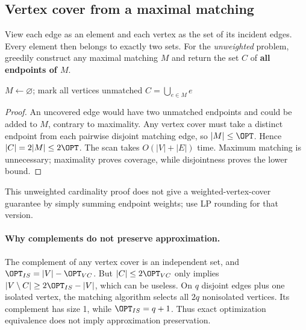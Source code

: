 \subsection{Vertex cover from a maximal matching}
\label{gre:vc}
View each edge as an element and each vertex as the set of its incident edges. Every
element then belongs to exactly two sets. For the \emph{unweighted} problem, greedily
construct any maximal matching $M$ and return the set $C$ of \textbf{all endpoints of $M$}.
\begin{algorithm}[H]
\caption{Maximal-matching vertex cover}
$M\gets\varnothing$; mark all vertices unmatched\;
\Return $C=\bigcup_{e\in M}e$\;
\end{algorithm}
\begin{proof}
An uncovered edge would have two unmatched endpoints and could be added to $M$, contrary
to maximality. Any vertex cover must take a distinct endpoint from each pairwise disjoint
matching edge, so $|M|\le\OPT$. Hence $|C|=2|M|\le2\OPT$.
The scan takes $O(|V|+|E|)$ time. Maximum matching is unnecessary; maximality proves
coverage, while disjointness proves the lower bound.
\end{proof}
This unweighted cardinality proof does not give a weighted-vertex-cover guarantee by
simply summing endpoint weights; use LP rounding for that version.

\paragraph{Why complements do not preserve approximation.}
The complement of any vertex cover is an independent set, and $\OPT_{IS}=|V|-\OPT_{VC}$.
But $|C|\le2\OPT_{VC}$ only implies
$|V\setminus C|\ge2\OPT_{IS}-|V|$, which can be useless. On $q$ disjoint edges plus one
isolated vertex, the matching algorithm selects all $2q$ nonisolated vertices. Its complement
has size 1, while $\OPT_{IS}=q+1$. Thus exact optimization equivalence does not imply
approximation preservation.

